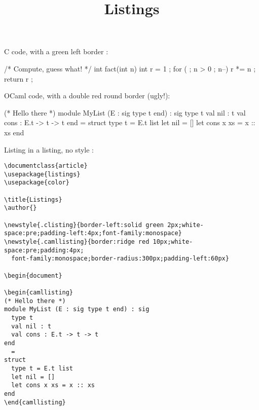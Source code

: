 \documentclass{article}
\title{Listings}
\author{}
\begin{document}
\maketitle


  {\lstset{language=C, style=colors}}
  {}

  {\lstset{language=caml, style=colors}}
  {}

C code, with a green left border :

\begin{clisting}
/* Compute, guess what! */
int fact(int n) {
  int r = 1 ;
  for ( ; n > 0 ; n--) {
    r *= n ;
  }
  return r ;
}
\end{clisting}

OCaml code, with a double red round border (ugly!):

\begin{camllisting}
(* Hello there *)
module MyList (E : sig type t end) : sig
  type t
  val nil : t
  val cons : E.t -> t -> t
end
  = 
struct
  type t = E.t list
  let nil = []
  let cons x xs = x :: xs
end
\end{camllisting}

Listing in a listing, no style :

\lstset{style=colors}

\begin{lstlisting}
\documentclass{article}
\usepackage{listings}
\usepackage{color}

\title{Listings}
\author{}

\newstyle{.clisting}{border-left:solid green 2px;white-space:pre;padding-left:4px;font-family:monospace}
\newstyle{.camllisting}{border:ridge red 10px;white-space:pre;padding:4px;
  font-family:monospace;border-radius:300px;padding-left:60px}

\begin{document}

\begin{camllisting}
(* Hello there *)
module MyList (E : sig type t end) : sig
  type t
  val nil : t
  val cons : E.t -> t -> t
end
  = 
struct
  type t = E.t list
  let nil = []
  let cons x xs = x :: xs
end
\end{camllisting}
\end{lstlisting}
\end{document}
